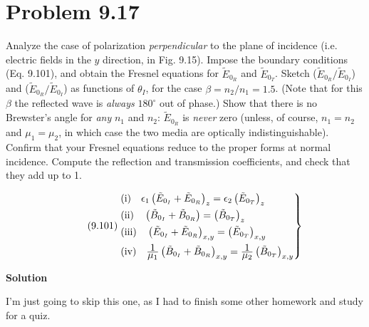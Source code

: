 \documentclass[12pt]{article}
\newcommand{\enterProblemHeader}[1]{
	\rhead{#1}
}
\newenvironment{homeworkProblem}[1]{
    \section{Problem #1}
    \enterProblemHeader{#1}
}{
	\pagebreak
}
\newcommand{\solution}{\textbf{\large Solution}}
\newcommand\ddfrac[2]{\frac{\displaystyle #1}{\displaystyle #2}}
\begin{document}
\begin{homeworkProblem}{9.17}
	Analyze the case of polarization \emph{perpendicular} to the plane of
	incidence (i.e. electric fields in the $y$ direction, in Fig. 9.15). Impose
	the boundary conditions (Eq. 9.101), and obtain the Fresnel equations for
	$\tilde E_{0_R}$ and $\tilde E_{0_T}$.  Sketch ($\tilde E_{0_R}/ \tilde
	E_{0_I}$) and ($\tilde E_{0_R}/ \tilde E_{0_I}$) as functions of $\theta_I$,
	for the case $\beta = n_2/n_1 = 1.5$. (Note that for this $\beta$ the
	reflected wave is \emph{always} $180^\circ$ out of phase.) Show that there
	is no Brewster's angle for \emph{any} $n_1$ and $n_2$: $\tilde E_{0_R}$ is
	\emph{never} zero (unless, of course, $n_1 = n_2$ and $\mu_1 = \mu_2$, in
	which case the two media are optically indistinguishable).  Confirm that
	your Fresnel equations reduce to the proper forms at normal incidence.
	Compute the reflection and transmission coefficients, and check that they
	add up to 1.

	\begin{equation}\tag{9.101}
	\begin{rcases}
		\text{(i)}\quad\epsilon_1 \left( \tilde E_{0_I} + \tilde E_{0_R}
		\right)_z = \epsilon_2 \left( \tilde E_{0_T} \right)_z\\
		\text{(ii)}\quad\left( \tilde B_{0_I} + \tilde B_{0_R} \right) = \left(
		\tilde B_{0_T} \right)_z\\
		\text{(iii)}\quad\left( \tilde E_{0_I} + \tilde E_{0_R} \right)_{x, y} =
		\left( \tilde E_{0_T} \right)_{x, y}\\
		\text{(iv)}\quad\ddfrac 1 {\mu_1} \left( \tilde B_{0_I} + \tilde B_{0_R}
		\right)_{x, y} = \ddfrac 1 {\mu_2} \left( \tilde B_{0_T} \right)_{x, y}
	\end{rcases}
	\end{equation}

	\solution

	I'm just going to skip this one, as I had to finish some other homework and
	study for a quiz.

\end{homeworkProblem}
\end{document}
